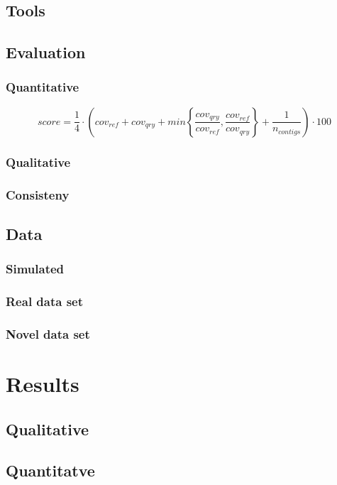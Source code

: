 \subsection{Tools}
\subsection{Evaluation}
\subsubsection{Quantitative}
\begin{equation}
  score = \frac{1}{4} \cdot \left( cov_{ref} +  cov_{qry} + min\left\{ \frac{cov_{qry}}{cov_{ref}}, \frac{cov_{ref}}{cov_{qry}}\right\} + \frac{1}{n_{contigs} }\right) \cdot 100 
\label{eqn:score_ass}
\end{equation}

\subsubsection{Qualitative}
\subsubsection{Consisteny}


\subsection{Data}
\subsubsection{Simulated}
\subsubsection{Real data set}
\subsubsection{Novel data set}


\section{Results}
\subsection{Qualitative}

\subsection{Quantitatve}
